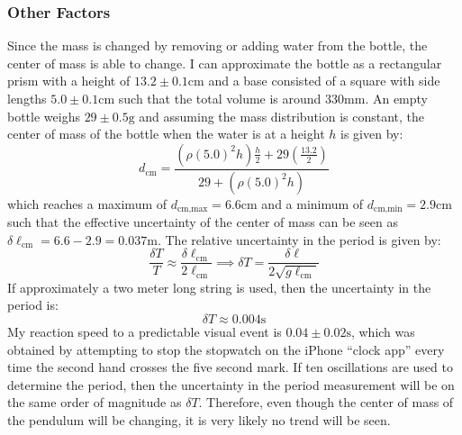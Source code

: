 \documentclass[%
 reprint,
 amsmath,amssymb
 aps,
]{revtex4-2}
\begin{document}
\subsubsection{Other Factors}
Since the mass is changed by removing or adding water from the bottle, the center of mass is able to change. I can approximate the bottle as a rectangular prism with a height of $13.2 \pm 0.1 \si{\centi\meter}$ and a base consisted of a square with side lengths $5.0 \pm 0.1 \si{\centi\meter}$ such that the total volume is around $330\si{\milli\meter}$. An empty bottle weighs $29 \pm 0.5 \si{\gram}$ and assuming the mass distribution is constant, the center of mass of the bottle when the water is at a height $h$ is given by:
\begin{equation}
    d_\text{cm} = \frac{\left(\rho(5.0)^2h\right)\frac{h}{2} + 29\left(\frac{13.2}{2}\right)}{29+\left(\rho(5.0)^2h\right)}
    \label{eq:}
\end{equation}
which reaches a maximum of $d_\text{cm,max}=6.6\si{\centi\meter}$ and a minimum of $d_\text{cm,min}=2.9\si{\centi\meter}$ such that the effective uncertainty of the center of mass can be seen as $\delta \ell_\text{cm}=6.6-2.9 = 0.037\si{\meter}$. The relative uncertainty in the period is given by:
\begin{equation}
    \frac{\delta T}{T} \approx \frac{\delta \ell_\text{cm}}{2\ell_\text{cm}} \implies \delta T = \frac{\delta \ell}{2\sqrt{g\ell_\text{cm}}}
    \label{eq:}
\end{equation}
If approximately a two meter long string is used, then the uncertainty in the period is:
\begin{equation}
    \delta T \approx 0.004\si{\second}
    \label{eq:}
\end{equation}
My reaction speed to a predictable visual event is $0.04 \pm 0.02\si{\second}$, which was obtained by attempting to stop the stopwatch on the iPhone ``clock app'' every time the second hand crosses the five second mark. If ten oscillations are used to determine the period, then the uncertainty in the period measurement will be on the same order of magnitude as $\delta T$. Therefore, even though the center of mass of the pendulum will be changing, it is very likely no trend will be seen.
\end{document}
